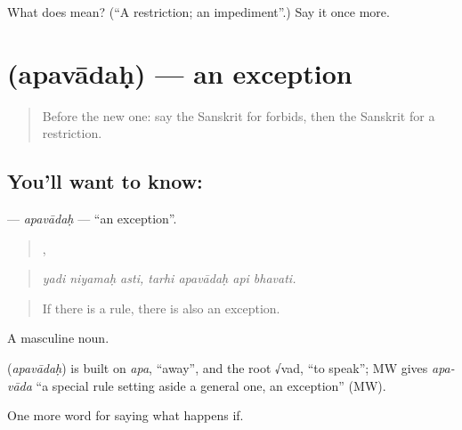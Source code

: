 \begin{tcolorbox}[breakable,colback=teal!4,colframe=teal!35!black,title={Before you move on}]
What does  mean? (\textquotedblleft{}A restriction; an impediment\textquotedblright{}.) Say it once more.
\end{tcolorbox}
\section[\texorpdfstring{\sk{अपवादः} (apavādaḥ)}{अपवादः (apavādaḥ)}]{ (apavādaḥ) — an exception}

\label{lesson:SA-C373-apavadah}



\begin{quote}
Before the new one: say the Sanskrit for forbids, then the Sanskrit for a restriction.
\end{quote}

\subsection*{You'll want to know: }
\textbf{} — \emph{apavādaḥ} — \textquotedblleft{}an exception\textquotedblright{}.

\begin{quote}
  ,    
\end{quote}

\begin{quote}
\emph{yadi niyamaḥ asti, tarhi apavādaḥ api bhavati.}
\end{quote}

\begin{quote}
If there is a rule, there is also an exception.
\end{quote}

A masculine noun.

\begin{cousinweb}
\textbf{} (\emph{apavādaḥ}) is built on \emph{apa}, \textquotedblleft{}away\textquotedblright{}, and the root √vad, \textquotedblleft{}to speak\textquotedblright{}; MW gives \emph{apa-vāda} \textquotedblleft{}a special rule setting aside a general one, an exception\textquotedblright{} (MW).
\end{cousinweb}

\begin{grammarlens}[title={What you've built}]
One more word for saying what happens if.
\end{grammarlens}

